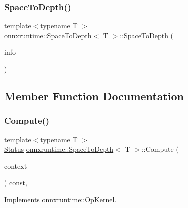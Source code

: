 \subsubsection{\texorpdfstring{Space\+To\+Depth()}{SpaceToDepth()}}
{\footnotesize\ttfamily template$<$typename T $>$ \\
\mbox{\hyperlink{classonnxruntime_1_1SpaceToDepth}{onnxruntime\+::\+Space\+To\+Depth}}$<$ T $>$\+::\mbox{\hyperlink{classonnxruntime_1_1SpaceToDepth}{Space\+To\+Depth}} (\begin{DoxyParamCaption}\item[{const \mbox{\hyperlink{classonnxruntime_1_1OpKernelInfo}{Op\+Kernel\+Info}} \&}]{info }\end{DoxyParamCaption})\hspace{0.3cm}{\ttfamily [inline]}}



\subsection{Member Function Documentation}
\mbox{\label{classonnxruntime_1_1SpaceToDepth_af8a3f43b9efd5269850b02eda30a3eba}} 
\subsubsection{\texorpdfstring{Compute()}{Compute()}\hspace{0.1cm}{\footnotesize\ttfamily [1/2]}}
{\footnotesize\ttfamily template$<$typename T $>$ \\
\mbox{\hyperlink{classonnxruntime_1_1common_1_1Status}{Status}} \mbox{\hyperlink{classonnxruntime_1_1SpaceToDepth}{onnxruntime\+::\+Space\+To\+Depth}}$<$ T $>$\+::Compute (\begin{DoxyParamCaption}\item[{\mbox{\hyperlink{classonnxruntime_1_1OpKernelContext}{Op\+Kernel\+Context}} $\ast$}]{context }\end{DoxyParamCaption}) const\hspace{0.3cm}{\ttfamily [override]}, {\ttfamily [virtual]}}



Implements \mbox{\hyperlink{classonnxruntime_1_1OpKernel_a9eca8656a78b1b3ab9d3351a12798650}{onnxruntime\+::\+Op\+Kernel}}.

